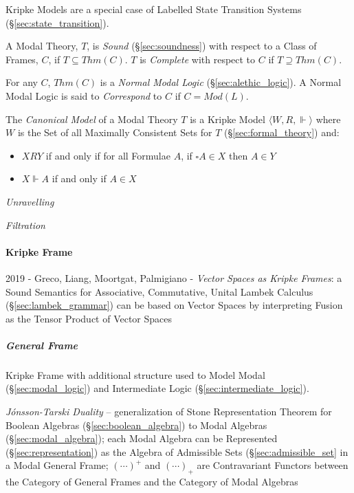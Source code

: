 Kripke Models are a special case of Labelled State Transition Systems
(\S\ref{sec:state_transition}).

A Modal Theory, $T$, is \emph{Sound} (\S\ref{sec:soundness}) with
respect to a Class of Frames, $C$, if $T \subseteq Thm(C)$. $T$ is
\emph{Complete} with respect to $C$ if $T \supseteq Thm(C)$.

For any $C$, $Thm(C)$ is a \emph{Normal Modal Logic}
(\S\ref{sec:alethic_logic}). A Normal Modal Logic is said to
\emph{Correspond} to $C$ if $C = Mod(L)$.

The \emph{Canonical Model} of a Modal Theory $T$ is a Kripke Model
$\langle W,R, \Vdash \rangle$ where $W$ is the Set of all Maximally
Consistent Sets for $T$ (\S\ref{sec:formal_theory}) and:
\begin{itemize}
\item $XRY$ if and only if for all Formulae $A$, if $\square A
  \in X$ then $A \in Y$
\item $X\Vdash A$ if and only if $A \in X$
\end{itemize}


\emph{Unravelling}

\emph{Filtration}



\paragraph{Kripke Frame}\label{sec:kripke_frame}\hfill

2019 - Greco, Liang, Moortgat, Palmigiano - \emph{Vector Spaces as Kripke
  Frames}: a Sound Semantics for Associative, Commutative, Unital Lambek
Calculus (\S\ref{sec:lambek_grammar}) can be based on Vector Spaces by
interpreting Fusion as the Tensor Product of Vector Spaces



\subparagraph{General Frame}\label{sec:general_frame}\hfill

Kripke Frame with additional structure used to Model Modal
(\S\ref{sec:modal_logic}) and Intermediate Logic
(\S\ref{sec:intermediate_logic}).

\emph{J\'onsson-Tarski Duality} --
generalization of Stone Representation Theorem for Boolean Algebras
(\S\ref{sec:boolean_algebra}) to Modal Algebras (\S\ref{sec:modal_algebra});
each Modal Algebra can be Represented (\S\ref{sec:representation}) as the
Algebra of Admissible Sets (\S\ref{sec:admissible_set} in a Modal General Frame;
$(\cdots)^+$ and $(\cdots)_+$ are Contravariant Functors between the Category of
General Frames and the Category of Modal Algebras



